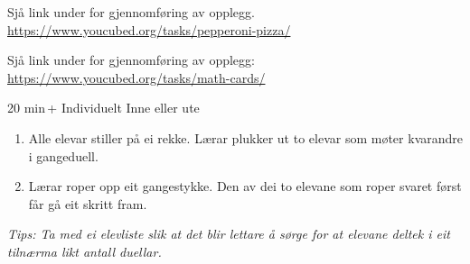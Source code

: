 








Sjå link under for gjennomføring av opplegg.\\
{\color{blue} \url{https://www.youcubed.org/tasks/pepperoni-pizza/}} 
\oplvsk


Sjå link under for gjennomføring av opplegg:\\
{\color{blue}\url{https://www.youcubed.org/tasks/math-cards/}}\vsk

\oplvsk

{20 min\,+}
{Individuelt}
{Inne eller ute}
\begin{enumerate}
	\item Alle elevar stiller på ei rekke. Lærar plukker ut to elevar som møter kvarandre i gangeduell.
	\item Lærar roper opp eit gangestykke. Den av dei to elevane som roper svaret først får gå eit skritt fram.
\end{enumerate}
\textit{Tips:  Ta med ei elevliste slik at det blir lettare å sørge for at elevane deltek i eit tilnærma likt antall duellar.}
